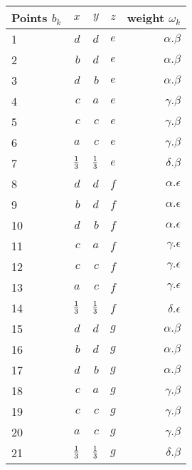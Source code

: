 \begin{center} \begin{tabular}{|l|r|r|r|r|} \hline
Points $b_k$    & $x$   & $y$   & $z$  &  weight $\omega_k$   \\ \hline
1               & $d$   & $d$   & $e$  & $ \alpha.\beta$  \\ \hline
2               & $b$   & $d$   & $e$  & $\alpha.\beta$   \\ \hline
3               & $d$   & $b$   & $e$  & $\alpha.\beta$   \\ \hline
4               & $c$   & $a$   & $e$  & $\gamma.\beta$   \\\hline
5               & $c$   & $c$   & $e$  & $\gamma.\beta$   \\ \hline
6               & $a$   & $c$   & $e$  & $\gamma.\beta$   \\ \hline
7               & ${ 1 \over 3 }$   & ${1 \over 3 }$  & $e$  & $\delta.\beta$   \\ \hline
8               & $d$   & $d$   & $f$  & $\alpha.\epsilon$  \\ \hline
9               & $b$   & $d$   & $f$  & $\alpha.\epsilon$  \\\hline
10               & $d$  & $b$   & $f$  & $\alpha.\epsilon$ \\\hline
11               & $c$  & $a$   & $f$  & $\gamma.\epsilon$ \\\hline
12               & $c$  & $c$   & $f$  & $\gamma.\epsilon$  \\\hline
13               & $a$  & $c$   & $f$  & $\gamma.\epsilon$ \\\hline
14               & ${1 \over 3 }$ & ${ 1 \over 3 }$  & $f$  & $\delta.\epsilon$ \\\hline                                           
15               & $d$  & $d$   & $g$  & $\alpha.\beta$    \\\hline
16               & $b$  & $d$   & $g$  & $\alpha.\beta$    \\\hline
17               & $d$  & $b$   & $g$  & $\alpha.\beta$     \\\hline
18               & $c$  & $a$   & $g$  & $\gamma.\beta$    \\\hline
19               & $c$  & $c$   & $g$  & $\gamma.\beta$     \\\hline
20               & $a$  & $c$   & $g$  & $\gamma.\beta$    \\\hline
21               & ${1 \over 3 }$  & ${ 1 \over 3 }$   & $g$  & $\delta.\beta$    \\\hline                                           
\end{tabular} \end{center}

